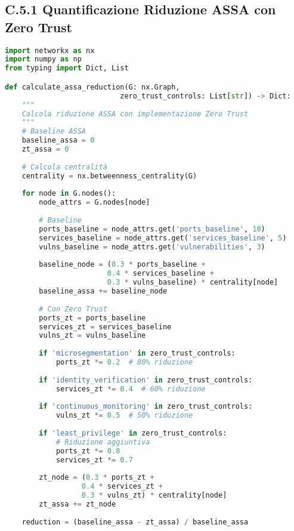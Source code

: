 \subsection{C.5.1 Quantificazione Riduzione ASSA con Zero Trust}

\begin{lstlisting}[language=Python, caption=Calcolo Riduzione ASSA con Zero Trust]
import networkx as nx
import numpy as np
from typing import Dict, List

def calculate_assa_reduction(G: nx.Graph, 
                           zero_trust_controls: List[str]) -> Dict:
    """
    Calcola riduzione ASSA con implementazione Zero Trust
    """
    # Baseline ASSA
    baseline_assa = 0
    zt_assa = 0
    
    # Calcola centralità
    centrality = nx.betweenness_centrality(G)
    
    for node in G.nodes():
        node_attrs = G.nodes[node]
        
        # Baseline
        ports_baseline = node_attrs.get('ports_baseline', 10)
        services_baseline = node_attrs.get('services_baseline', 5)
        vulns_baseline = node_attrs.get('vulnerabilities', 3)
        
        baseline_node = (0.3 * ports_baseline + 
                        0.4 * services_baseline + 
                        0.3 * vulns_baseline) * centrality[node]
        baseline_assa += baseline_node
        
        # Con Zero Trust
        ports_zt = ports_baseline
        services_zt = services_baseline
        vulns_zt = vulns_baseline
        
        if 'microsegmentation' in zero_trust_controls:
            ports_zt *= 0.2  # 80% riduzione
            
        if 'identity_verification' in zero_trust_controls:
            services_zt *= 0.4  # 60% riduzione
            
        if 'continuous_monitoring' in zero_trust_controls:
            vulns_zt *= 0.5  # 50% riduzione
            
        if 'least_privilege' in zero_trust_controls:
            # Riduzione aggiuntiva
            ports_zt *= 0.8
            services_zt *= 0.7
        
        zt_node = (0.3 * ports_zt + 
                  0.4 * services_zt + 
                  0.3 * vulns_zt) * centrality[node]
        zt_assa += zt_node
    
    reduction = (baseline_assa - zt_assa) / baseline_assa
    

\end{lstlisting}
